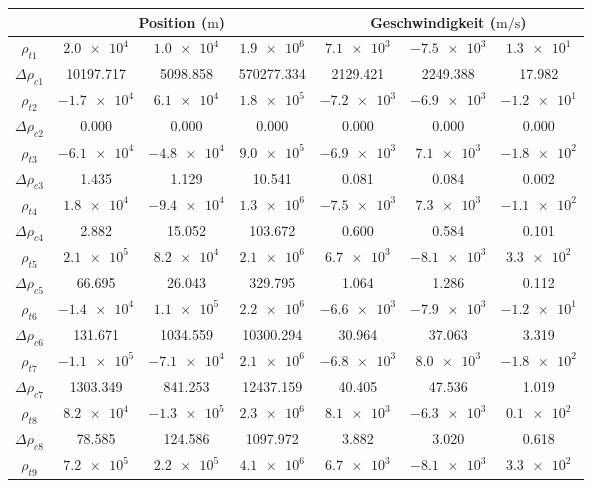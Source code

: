 \documentclass[a4paper,12pt]{article}
\numberwithin{equation}{section}
\begin{document}
\renewcommand{\arraystretch}{1.1}
\begin{longtable}{|c|c|c|c|c|c|c|}
\cline{2-7}
\multicolumn{1}{c|}{} & \multicolumn{3}{c|}{Position ($\si{\meter}$)} & \multicolumn{3}{c|}{Geschwindigkeit ($\si{\meter\per\second}$)} \\
\cline{2-7}\hline
$\rho_{t1}$ & $\num{2.0e4}$ & $\num{1.0e4}$ & $\num{1.9e6}$ & $\num{7.1e3} $ & $\num{-7.5e3}$ & $\num{1.3e1}$ \\
$\Delta \rho_{c1}$ & 10197.717 & 5098.858 & 570277.334 & 2129.421 & 2249.388 & 17.982 \\
\hline
$\rho_{t2}$ & $\num{-1.7e4}$ & $\num{6.1e4}$ & $\num{1.8e5}$ & $\num{-7.2e3}$ & $\num{-6.9e3}$ & $\num{-1.2e1}$ \\
$\Delta \rho_{c2}$ & 0.000 & 0.000 & 0.000 & 0.000 & 0.000 & 0.000 \\
\hline
$\rho_{t3}$ & $\num{-6.1e4}$ & $\num{-4.8e4}$ & $\num{9.0e5}$ & $\num{-6.9e3}$ & $\num{7.1e3}$ & $\num{-1.8e2}$ \\
$\Delta \rho_{c3}$ & 1.435 & 1.129 & 10.541 & 0.081 & 0.084 & 0.002 \\
\hline
$\rho_{t4}$ & $\num{1.8e4}$ & $\num{-9.4e4}$ & $\num{1.3e6}$ & $\num{-7.5e3}$ & $\num{7.3e3}$ & $\num{-1.1e2}$ \\
$\Delta \rho_{c4}$ & 2.882 & 15.052 & 103.672 & 0.600 & 0.584 & 0.101 \\
\hline
$\rho_{t5}$ & $\num{2.1e5}$ & $\num{8.2e4}$ & $\num{2.1e6}$ & $\num{6.7e3} $ & $\num{-8.1e3}$ & $\num{3.3e2}$ \\
$\Delta \rho_{c5}$ & 66.695 & 26.043 & 329.795 & 1.064 & 1.286 & 0.112 \\
\hline
$\rho_{t6}$ & $\num{-1.4e4}$ & $\num{1.1e5}$ & $\num{2.2e6}$ & $\num{-6.6e3}$ & $\num{-7.9e3}$ & $\num{-1.2e1}$ \\
$\Delta \rho_{c6}$ & 131.671 & 1034.559 & 10300.294 & 30.964 & 37.063 & 3.319 \\
\hline
$\rho_{t7}$ & $\num{-1.1e5}$ & $\num{-7.1e4}$ & $\num{2.1e6}$ & $\num{-6.8e3}$ & $\num{8.0e3}$ & $\num{-1.8e2}$ \\
$\Delta \rho_{c7}$ & 1303.349 & 841.253 & 12437.159 & 40.405 & 47.536 & 1.019 \\
\hline
$\rho_{t8}$ & $\num{8.2e4}$ & $\num{-1.3e5}$ & $\num{2.3e6}$ & $\num{8.1e3}$ & $\num{-6.3e3}$ & $\num{0.1e2}$ \\
$\Delta \rho_{c8}$ & 78.585 & 124.586 & 1097.972 & 3.882 & 3.020 & 0.618 \\
\hline
$\rho_{t9}$ & $\num{7.2e5}$ & $\num{2.2e5}$ & $\num{4.1e6}$ & $\num{6.7e3} $ & $\num{-8.1e3}$ & $\num{3.3e2}$ \\

\end{longtable}
\end{document}
